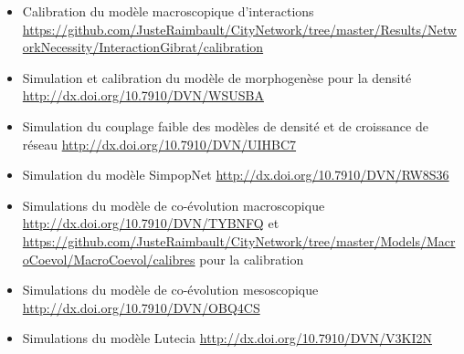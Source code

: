 {\begin{itemize}
	\item Calibration du modèle macroscopique d'interactions \url{https://github.com/JusteRaimbault/CityNetwork/tree/master/Results/NetworkNecessity/InteractionGibrat/calibration}
	\item Simulation et calibration du modèle de morphogenèse pour la densité \url{http://dx.doi.org/10.7910/DVN/WSUSBA}
	\item Simulation du couplage faible des modèles de densité et de croissance de réseau \url{http://dx.doi.org/10.7910/DVN/UIHBC7}
	\item Simulation du modèle SimpopNet \url{http://dx.doi.org/10.7910/DVN/RW8S36}
	\item Simulations du modèle de co-évolution macroscopique \url{http://dx.doi.org/10.7910/DVN/TYBNFQ} et \url{https://github.com/JusteRaimbault/CityNetwork/tree/master/Models/MacroCoevol/MacroCoevol/calibres} pour la calibration
	\item Simulations du modèle de co-évolution mesoscopique \url{http://dx.doi.org/10.7910/DVN/OBQ4CS}
	\item Simulations du modèle Lutecia \url{http://dx.doi.org/10.7910/DVN/V3KI2N}
\end{itemize}
}



\stars









